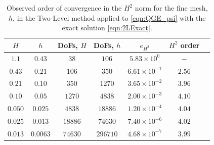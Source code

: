\begin{table}
  \begin{center}
    \begin{tabular}{|c|c|c|c|c|c|c|}
    \hline
      $H$ &   $h$  &  DoFs, $ H $ & DoFs, $ h $ & $e_{H^2}$ & $H^2$ order \\
      \hline
      $1.1$ & $0.43$ & $38$ & $106$ & $5.83\times 10^0$ & $-$ \\[0.2em]
      $0.43$ & $0.21$ & $106$ & $350$ & $6.61\times 10^{-1}$ & $2.56$ \\[0.2em]
      $0.21$ & $0.10$ & $350$ & $1270$ & $3.65\times 10^{-2}$ & $3.96$ \\[0.2em]
      $0.10$ & $0.05$ & $1270$ & $4838$ & $2.00 \times 10^{-3}$ & $4.10$ \\[0.2em]
      $0.050$ & $0.025$ & $4838$ & $18886$ & $1.20\times 10^{-4}$ & $4.04$ \\[0.2em]
      $0.025$ & $0.013$ & $18886$ & $74630$ & $7.40\times 10^{-6}$ & $4.02$ \\[0.2em]
      $0.013$ & $0.0063$ & $74630$ & $296710$ & $4.68\times 10^{-7}$ & $3.99$ \\[0.2em]
    \hline
    \end{tabular}
  \end{center}
  \caption{Observed order of convergence in the $H^2$ norm for the fine mesh,
    $h$, in the Two-Level method applied to \eqref{eqn:QGE_psi} with the exact
    solution \eqref{eqn:2LExact}.}
  \label{tab:TwoLevelh}
\end{table}

